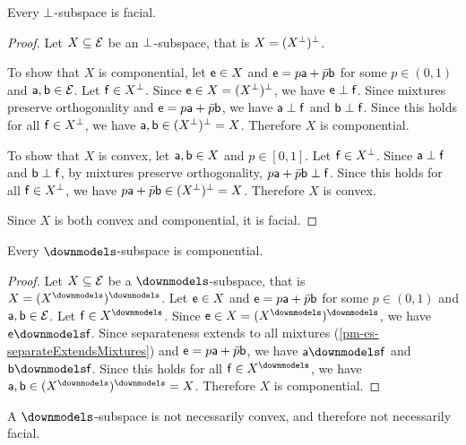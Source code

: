 \begin{mathSection}
	\begin{prop}
		Every $\ortho$-subspace is facial.
	\end{prop}
	
	\begin{proof}
		Let $X \subseteq \Ens$ be an $\ortho$-subspace, that is $X = (X^\ortho)^\ortho$.
		
		To show that $X$ is componential, let $\ens \in X$ and $\ens = p\ens[a] + \bar{p}\ens[b]$ for some $p \in (0,1)$ and $\ens[a], \ens[b] \in \Ens$. Let $\ens[f] \in X^\ortho$. Since $\ens \in X = (X^\ortho)^\ortho$, we have $\ens \ortho \ens[f]$. Since mixtures preserve orthogonality and $\ens = p\ens[a] + \bar{p}\ens[b]$, we have $\ens[a] \ortho \ens[f]$ and $\ens[b] \ortho \ens[f]$. Since this holds for all $\ens[f] \in X^\ortho$, we have $\ens[a], \ens[b] \in (X^\ortho)^\ortho = X$. Therefore $X$ is componential.
		
		To show that $X$ is convex, let $\ens[a], \ens[b] \in X$ and $p \in [0,1]$. Let $\ens[f] \in X^\ortho$. Since $\ens[a] \ortho \ens[f]$ and $\ens[b] \ortho \ens[f]$, by mixtures preserve orthogonality, $p\ens[a] + \bar{p}\ens[b] \ortho \ens[f]$. Since this holds for all $\ens[f] \in X^\ortho$, we have $p\ens[a] + \bar{p}\ens[b] \in (X^\ortho)^\ortho = X$. Therefore $X$ is convex.
		
		Since $X$ is both convex and componential, it is facial.
	\end{proof}
	
	\begin{prop}
		Every $\separate$-subspace is componential.
	\end{prop}
	
	\begin{proof}
		Let $X \subseteq \Ens$ be a $\separate$-subspace, that is $X = (X^\separate)^\separate$. Let $\ens \in X$ and $\ens = p\ens[a] + \bar{p}\ens[b]$ for some $p \in (0,1)$ and $\ens[a], \ens[b] \in \Ens$. Let $\ens[f] \in X^\separate$. Since $\ens \in X = (X^\separate)^\separate$, we have $\ens \separate \ens[f]$. Since separateness extends to all mixtures (\ref{pm-es-separateExtendsMixtures}) and $\ens = p\ens[a] + \bar{p}\ens[b]$, we have $\ens[a] \separate \ens[f]$ and $\ens[b] \separate \ens[f]$. Since this holds for all $\ens[f] \in X^\separate$, we have $\ens[a], \ens[b] \in (X^\separate)^\separate = X$. Therefore $X$ is componential.
	\end{proof}
	
	\begin{prop}
		A $\separate$-subspace is not necessarily convex, and therefore not necessarily facial.
	\end{prop}
	

\end{mathSection}
